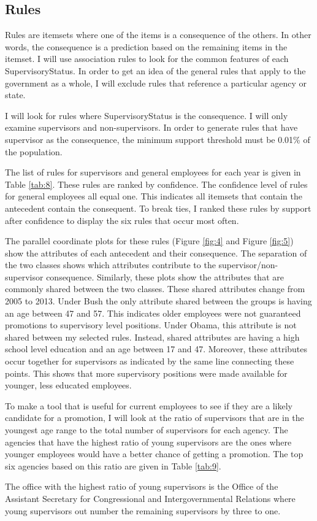 \documentclass{article}
\begin{document}
    \subsection{Rules}
    Rules are itemsets where one of the items is a consequence of the others. In other words, the consequence is a prediction based on the remaining items in the itemset. I will use association rules to look for the common features of each SupervisoryStatus. In order to get an idea of the general rules that apply to the government as a whole, I will exclude rules that reference a particular agency or state.
    \par
    I will look for rules where SupervisoryStatus is the consequence. I will only examine supervisors and non-supervisors. In order to generate rules that have supervisor as the consequence, the minimum support threshold must be 0.01\% of the population.
    \par
    The list of rules for supervisors and general employees for each year is given in Table \ref{tab:8}. These rules are ranked by confidence. The confidence level of rules for general employees all equal one. This indicates all itemsets that contain the antecedent contain the consequent. To break ties, I ranked these rules by support after confidence to display the six rules that occur most often.
    \par
    The parallel coordinate plots for these rules (Figure \ref{fig:4} and Figure \ref{fig:5}) show the attributes of each antecedent and their consequence. The separation of the two classes shows which attributes contribute to the supervisor/non-supervisor consequence. Similarly, these plots show the attributes that are commonly shared between the two classes. These shared attributes change from 2005 to 2013. Under Bush the only attribute shared between the groups is having an age between 47 and 57. This indicates older employees were not guaranteed promotions to supervisory level positions. Under Obama, this attribute is not shared between my selected rules. Instead, shared attributes are having a high school level education and an age between 17 and 47. Moreover, these attributes occur together for supervisors as indicated by the same line connecting these points. This shows that more supervisory positions were made available for younger, less educated employees.
    \par
    To make a tool that is useful for current employees to see if they are a likely candidate for a promotion, I will look at the ratio of supervisors that are in the youngest age range to the total number of supervisors for each agency. The agencies that have the highest ratio of young supervisors are the ones where younger employees would have a better chance of getting a promotion. The top six agencies based on this ratio are given in Table \ref{tab:9}.
    \par
    The office with the highest ratio of young supervisors is the Office of the Assistant Secretary for Congressional and Intergovernmental Relations where young supervisors out number the remaining supervisors by three to one.
\end{document}
